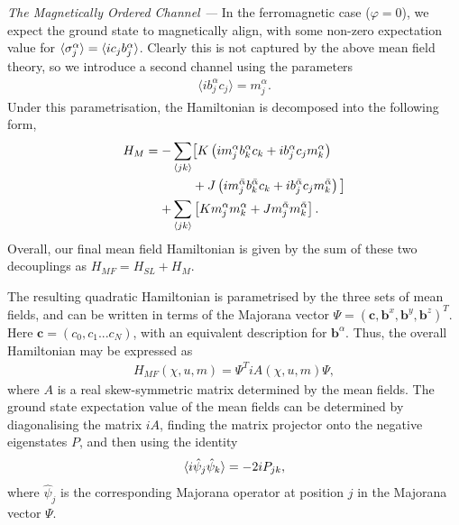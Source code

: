{\it The Magnetically Ordered Channel ---} In the ferromagnetic case ($\varphi = 0$), we expect the ground state to magnetically align, with some non-zero expectation value for $\braket{\sigma^\alpha_j} = \braket{i c_j b^\alpha_j}$. Clearly this is not captured by the above mean field theory, so we introduce a second channel using the parameters
\begin{align} \label{eqn:m_mean_field}
    \langle i b^\alpha_j   c_j \rangle = m^\alpha _j.
\end{align}
Under this parametrisation, the Hamiltonian is decomposed into the following form,
\begin{align} \begin{aligned}
    H_{M} = - \sum_{\braket{jk}} &\big [  
    K \left ( 
    im^\alpha_j b^\alpha_k c_k  + 
    ib^\alpha_j c_j m^\alpha_k  
    \right )   \\ 
    &  + 
    J \left ( 
    im^{\bar \alpha}_j b^{\bar \alpha}_k c_k  + 
    ib^{\bar \alpha}_j c_j m^{\bar \alpha}_k  
     \right ) 
    \big] \\ 
    + \sum_{\braket{jk}} 
    & \left [ 
    K m^\alpha_j m^\alpha_k 
    + J m^{\bar \alpha}_j m^{\bar \alpha}_k 
    \right ].
\end{aligned}\end{align}
Overall, our final mean field Hamiltonian is given by the sum of these two decouplings as $H_{MF} = H_{SL} + H_{M}$. 


The resulting quadratic Hamiltonian is parametrised by the three sets of mean fields, and can be written in terms of the Majorana vector $\Psi = (\bm c, \bm b^x, \bm b^y, \bm b^z)^T$. Here $\bm c = (c_0, c_1 ... c_N)$, with an equivalent description for $\bm b^\alpha$. Thus, the overall Hamiltonian may be expressed as
\begin{align}
    H_{MF}(\chi, u, m) = \Psi^T iA(\chi, u, m)  \Psi,
\end{align}
where $A$ is a real skew-symmetric matrix determined by the mean fields. The ground state expectation value of the mean fields can be determined by diagonalising the matrix $iA$, finding the matrix projector onto the negative eigenstates $P$, and then using the identity
\begin{align} 
    \braket{i \hat \psi_j \hat \psi_k} = -2i P_{jk},
\end{align}
where $\hat \psi_j$ is the corresponding Majorana operator at position $j$ in the Majorana vector $\Psi$.

